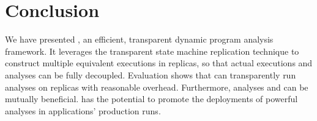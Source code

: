 \section{Conclusion} \label{sec:conclusion}

We have presented \xxx, an efficient, transparent dynamic program analysis 
framework. It leverages the transparent state machine replication technique to construct multiple equivalent 
executions in replicas, so that actual executions and analyses can be fully 
decoupled. Evaluation shows that \xxx can transparently run analyses on 
replicas with reasonable overhead. Furthermore, analyses and \xxx can be 
mutually beneficial. \xxx has the potential to promote the deployments of 
powerful analyses in applications' production runs.